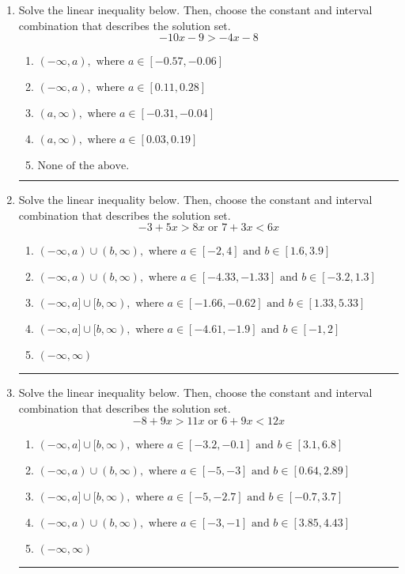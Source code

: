 \documentclass[14pt]{extbook}
\newcommand{\litem}[1]{\item#1\hspace*{-1cm}\rule{\textwidth}{0.4pt}}
\begin{document}
\begin{enumerate}
\litem{
Solve the linear inequality below. Then, choose the constant and interval combination that describes the solution set.\[ -10x -9 > -4x -8 \]\begin{enumerate}[label=\Alph*.]
\item \( (-\infty, a), \text{ where } a \in [-0.57, -0.06] \)
\item \( (-\infty, a), \text{ where } a \in [0.11, 0.28] \)
\item \( (a, \infty), \text{ where } a \in [-0.31, -0.04] \)
\item \( (a, \infty), \text{ where } a \in [0.03, 0.19] \)
\item \( \text{None of the above}. \)

\end{enumerate} }
\litem{
Solve the linear inequality below. Then, choose the constant and interval combination that describes the solution set.\[ -3 + 5 x > 8 x \text{ or } 7 + 3 x < 6 x \]\begin{enumerate}[label=\Alph*.]
\item \( (-\infty, a) \cup (b, \infty), \text{ where } a \in [-2, 4] \text{ and } b \in [1.6, 3.9] \)
\item \( (-\infty, a) \cup (b, \infty), \text{ where } a \in [-4.33, -1.33] \text{ and } b \in [-3.2, 1.3] \)
\item \( (-\infty, a] \cup [b, \infty), \text{ where } a \in [-1.66, -0.62] \text{ and } b \in [1.33, 5.33] \)
\item \( (-\infty, a] \cup [b, \infty), \text{ where } a \in [-4.61, -1.9] \text{ and } b \in [-1, 2] \)
\item \( (-\infty, \infty) \)

\end{enumerate} }
\litem{
Solve the linear inequality below. Then, choose the constant and interval combination that describes the solution set.\[ -8 + 9 x > 11 x \text{ or } 6 + 9 x < 12 x \]\begin{enumerate}[label=\Alph*.]
\item \( (-\infty, a] \cup [b, \infty), \text{ where } a \in [-3.2, -0.1] \text{ and } b \in [3.1, 6.8] \)
\item \( (-\infty, a) \cup (b, \infty), \text{ where } a \in [-5, -3] \text{ and } b \in [0.64, 2.89] \)
\item \( (-\infty, a] \cup [b, \infty), \text{ where } a \in [-5, -2.7] \text{ and } b \in [-0.7, 3.7] \)
\item \( (-\infty, a) \cup (b, \infty), \text{ where } a \in [-3, -1] \text{ and } b \in [3.85, 4.43] \)
\item \( (-\infty, \infty) \)


\end{enumerate}}
\end{enumerate}
\end{document}
